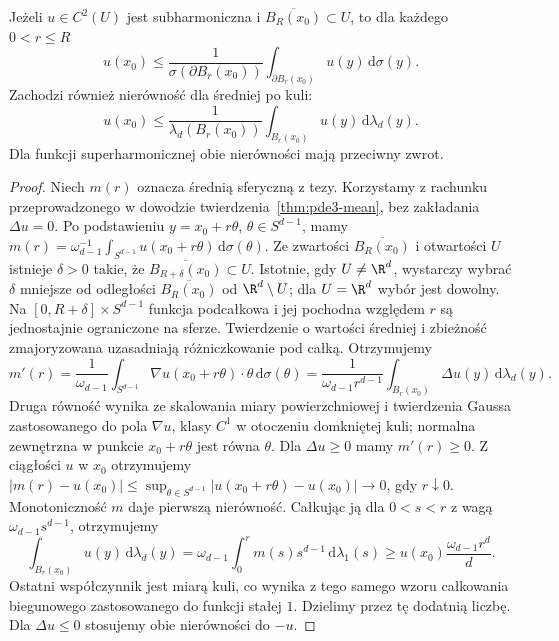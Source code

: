 \begin{twierdzenie}
\label{thm:pde14-sub-mean}
Jeżeli $u\in C^2(U)$ jest subharmoniczna i
$\overline{B_R(x_0)}\subset U$, to dla każdego $0<r\le R$
\[
 u(x_0)\le \frac{1}{\sigma(\partial B_r(x_0))}
 \int_{\partial B_r(x_0)}u(y)\,\mathrm d\sigma(y).
\]
Zachodzi również nierówność dla średniej po kuli:
\[
 u(x_0)\le \frac1{\lambda_d(B_r(x_0))}
 \int_{B_r(x_0)}u(y)\,\mathrm d\lambda_d(y).
\]
Dla funkcji superharmonicznej obie nierówności mają przeciwny zwrot.
\end{twierdzenie}
\begin{proof}
Niech $m(r)$ oznacza średnią sferyczną z tezy.
Korzystamy z rachunku przeprowadzonego w dowodzie
twierdzenia~\ref{thm:pde3-mean}, bez zakładania $\Delta u=0$.
Po podstawieniu $y=x_0+r\theta$, $\theta\in S^{d-1}$,
mamy $m(r)=\omega_{d-1}^{-1}
\int_{S^{d-1}}u(x_0+r\theta)\,\mathrm d\sigma(\theta)$.
Ze zwartości $\overline{B_R(x_0)}$ i otwartości $U$
istnieje $\delta>0$ takie, że $\overline{B_{R+\delta}(x_0)}
\subset U$. Istotnie, gdy $U\ne\R^d$, wystarczy wybrać
$\delta$ mniejsze od odległości $\overline{B_R(x_0)}$
od $\R^d\setminus U$; dla $U=\R^d$ wybór jest dowolny.
Na $[0,R+\delta]\times S^{d-1}$ funkcja podcałkowa
i jej pochodna względem $r$
są jednostajnie ograniczone na sferze. Twierdzenie
o wartości średniej i zbieżność zmajoryzowana
uzasadniają różniczkowanie pod całką. Otrzymujemy
\[
 m'(r)=\frac1{\omega_{d-1}}
 \int_{S^{d-1}}\nabla u(x_0+r\theta)\cdot\theta\,
 \mathrm d\sigma(\theta)
 =\frac1{\omega_{d-1}r^{d-1}}
 \int_{B_r(x_0)}\Delta u(y)\,\mathrm d\lambda_d(y).
\]
Druga równość wynika ze skalowania miary powierzchniowej
i twierdzenia Gaussa zastosowanego do pola $\nabla u$,
klasy $C^1$ w otoczeniu domkniętej kuli; normalna
zewnętrzna w punkcie $x_0+r\theta$ jest równa $\theta$.
Dla $\Delta u\ge0$ mamy $m'(r)\ge0$.
Z ciągłości $u$ w $x_0$ otrzymujemy
$|m(r)-u(x_0)|\le
\sup_{\theta\in S^{d-1}}|u(x_0+r\theta)-u(x_0)|\to0$,
gdy $r\downarrow0$. Monotoniczność $m$ daje pierwszą
nierówność. Całkując ją dla $0<s<r$ z wagą
$\omega_{d-1}s^{d-1}$, otrzymujemy
\[
 \int_{B_r(x_0)}u(y)\,\mathrm d\lambda_d(y)
 =\omega_{d-1}\int_0^r m(s)s^{d-1}\,\mathrm d\lambda_1(s)
 \ge u(x_0)\frac{\omega_{d-1}r^d}{d}.
\]
Ostatni współczynnik jest miarą kuli, co wynika
z tego samego wzoru całkowania biegunowego zastosowanego
do funkcji stałej $1$. Dzielimy przez tę dodatnią liczbę.
Dla $\Delta u\le0$ stosujemy obie nierówności do $-u$.
\end{proof}

